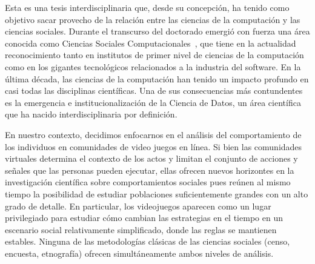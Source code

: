 \documentclass[a4paper,11pt]{book}
\theoremstyle{definition}
\begin{document}
Esta es una tesis interdisciplinaria que, desde su concepción, ha tenido como objetivo sacar provecho de la relación entre las ciencias de la computación y las ciencias sociales.
%
Durante el transcurso del doctorado emergió con fuerza una área conocida como Ciencias Sociales Computacionales~\cite{lazer2009-computationalSocialScience, lazer2020-computationalSocialScience}, que tiene en la actualidad reconocimiento tanto en institutos de primer nivel de ciencias de la computación como en los gigantes tecnológicos relacionados a la industria del software.
%
%
%
En la última década, las ciencias de la computación han tenido un impacto profundo en casi todas las disciplinas científicas.%
%
Una de sus consecuencias más contundentes es la emergencia e institucionalización de la Ciencia de Datos, un área científica que ha nacido interdisciplinaria por definición.


En nuestro contexto, decidimos enfocarnos en el análisis del comportamiento de los individuos en comunidades de video juegos en línea.
%
Si bien las comunidades virtuales determina el contexto de los actos y limitan el conjunto de acciones y se\~nales que las personas pueden ejecutar, ellas ofrecen nuevos horizontes en la investigaci\'on cient\'ifica sobre comportamientos sociales pues re\'unen al mismo tiempo la posibilidad de estudiar poblaciones suficientemente grandes con un alto grado de detalle.
%
En particular, los videojuegos aparecen como un lugar privilegiado para estudiar cómo cambian las estrategias en el tiempo en un escenario social relativamente simplificado, donde las reglas se mantienen estables.
%
Ninguna de las metodolog\'ias cl\'asicas de las ciencias sociales (censo, encuesta, etnograf\'ia) ofrecen simult\'aneamente ambos niveles de análisis.

\end{document}
